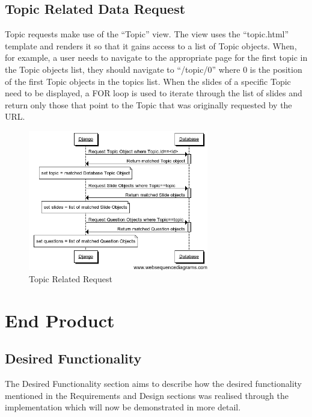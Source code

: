 \documentclass{l3proj}
\begin{document}
{\subsection{Topic Related Data Request}
Topic requests make use of the “Topic” view. The view uses the “topic.html” template and renders it so that it gains access to a list of Topic objects. When, for example, a user needs to navigate to the appropriate page for the first topic in the Topic objects list, they should navigate to “/topic/0” where 0 is the position of the first Topic objects in the topics list. When the slides of a specific Topic need to be displayed, a FOR loop is used to iterate through the list of slides and return only those that point to the Topic that was originally requested by the URL.

\begin{figure}[h!]
   \caption{Topic Related Request}
   \centering
     \includegraphics[width=0.7\textwidth]{images/topicRelatedRequest.png}
\end{figure} 

\section{End Product}
\subsection{Desired Functionality}
The Desired Functionality section aims to describe how the desired
functionality mentioned in the Requirements and Design sections was
realised through the implementation which will now be demonstrated in more detail.

}
\end{document}
